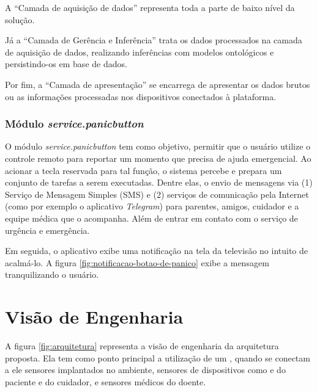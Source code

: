 

A ``Camada de aquisição de dados'' representa toda a parte de baixo nível da
solução.

Já a ``Camada de Gerência e Inferência'' trata os dados processados na camada
de aquisição de dados, realizando inferências com modelos ontológicos e 
persistindo-os em base de dados.

Por fim, a ``Camada de apresentação'' se encarrega de apresentar os dados brutos
ou as informações processadas nos dispositivos conectados à plataforma.


\subsubsection{Módulo \textit{service.panicbutton}}\label{subsubsec:panicbutton}

O módulo \textit{service.panicbutton} tem como objetivo, permitir que o usuário
utilize o controle remoto para reportar um momento que precisa de ajuda 
emergencial. Ao acionar a tecla reservada para tal função, o sistema percebe e
prepara um conjunto de tarefas a serem executadas. Dentre elas, o envio de 
mensagens via (1) Serviço de Mensagem Simples (SMS) e (2) serviços de comunicação
pela Internet (como por exemplo o aplicativo \textit{Telegram}) para parentes, 
amigos, cuidador e a equipe médica que o acompanha. Além de entrar em contato
com o serviço de urgência e emergência.

Em seguida, o aplicativo exibe uma notificação na tela da televisão no intuito
de acalmá-lo. A figura \ref{fig:notificacao-botao-de-panico} exibe a mensagem 
tranquilizando o usuário.


\section{Visão de Engenharia} \label{sec:visao-engenharia}

A figura \ref{fig:arquitetura} representa a visão de engenharia da arquitetura
proposta. Ela tem como ponto principal a utilização de um \stb[], quando se
conectam a ele sensores  implantados no ambiente, sensores de dispositivos como
\smartphones[] e  \smartwatches[] do paciente e do cuidador, e sensores médicos
do doente.

